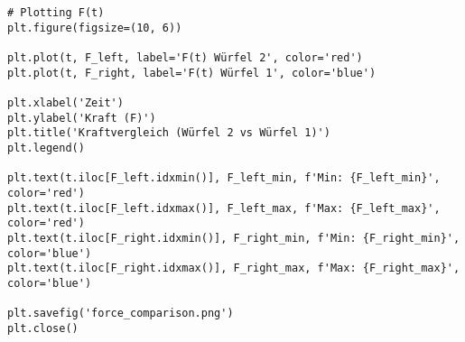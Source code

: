 \documentclass{article}
\begin{document}
\begin{lstlisting}[caption={Plotter.py}, label={Plotter}, basicstyle=\ttfamily\small]
# Plotting F(t)
plt.figure(figsize=(10, 6))

plt.plot(t, F_left, label='F(t) Würfel 2', color='red')
plt.plot(t, F_right, label='F(t) Würfel 1', color='blue')

plt.xlabel('Zeit')
plt.ylabel('Kraft (F)')
plt.title('Kraftvergleich (Würfel 2 vs Würfel 1)')
plt.legend()

plt.text(t.iloc[F_left.idxmin()], F_left_min, f'Min: {F_left_min}', color='red')
plt.text(t.iloc[F_left.idxmax()], F_left_max, f'Max: {F_left_max}', color='red')
plt.text(t.iloc[F_right.idxmin()], F_right_min, f'Min: {F_right_min}', color='blue')
plt.text(t.iloc[F_right.idxmax()], F_right_max, f'Max: {F_right_max}', color='blue')

plt.savefig('force_comparison.png')
plt.close()

\end{lstlisting}
\end{document}
